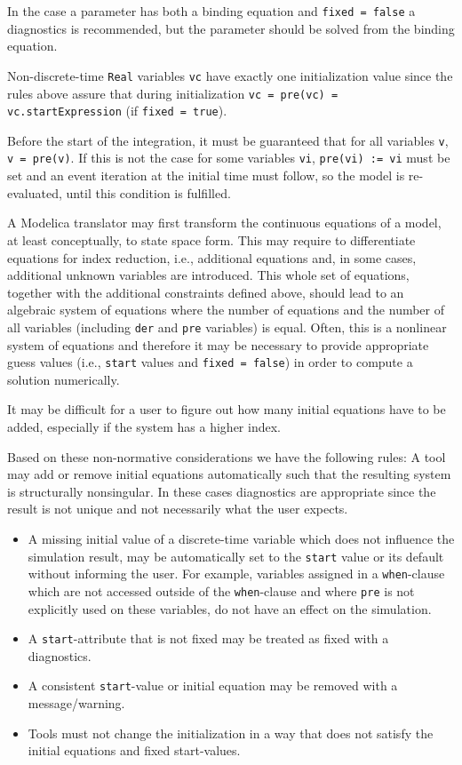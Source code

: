 \begin{nonnormative}
In the case a parameter has both a binding equation and \lstinline!fixed = false! a diagnostics is recommended, but the parameter should be solved from the binding equation.

Non-discrete-time \lstinline!Real! variables \lstinline!vc! have exactly one initialization value since the rules above assure that during initialization
\lstinline!vc = pre(vc) = vc.startExpression! (if \lstinline!fixed = true!).

Before the start of the integration, it must be guaranteed that for all variables \lstinline!v!, \lstinline!v = pre(v)!. If this is not the case for some variables
\lstinline!vi!, \lstinline!pre(vi) := vi! must be set and an event iteration at the initial time must follow, so the model is re-evaluated, until this condition is fulfilled.

A Modelica translator may first transform the continuous equations of a model, at least conceptually, to state space form.  This may require to differentiate equations for index
reduction, i.e., additional equations and, in some cases, additional unknown variables are introduced.  This whole set of equations, together with the additional constraints
defined above, should lead to an algebraic system of equations where the number of equations and the number of all variables (including \lstinline!der! and \lstinline!pre!
variables) is equal.  Often, this is a nonlinear system of equations and therefore it may be necessary to provide appropriate guess values (i.e., \lstinline!start! values and
\lstinline!fixed = false!) in order to compute a solution numerically.

It may be difficult for a user to figure out how many initial equations have to be added, especially if the system has a higher index.
\end{nonnormative}
Based on these non-normative considerations we have the following rules:
A tool may add or remove initial equations automatically such that the resulting system is structurally nonsingular.
In these cases diagnostics are appropriate since the result is not unique and not necessarily what the user expects.
\begin{itemize}
\item A missing initial value of a discrete-time variable which does not influence the simulation result, may be automatically set to the \lstinline!start! value or its default without informing the user.
For example, variables assigned in a \lstinline!when!-clause which are not accessed outside of the \lstinline!when!-clause and where \lstinline!pre! is not explicitly used on these variables, do not have an effect on the simulation.
\item A \lstinline!start!-attribute that is not fixed may be treated as fixed with a diagnostics.
\item A consistent \lstinline!start!-value or initial equation may be removed with a message/warning.
\item Tools must not change the initialization in a way that does not satisfy the initial equations and fixed start-values.
\end{itemize}


